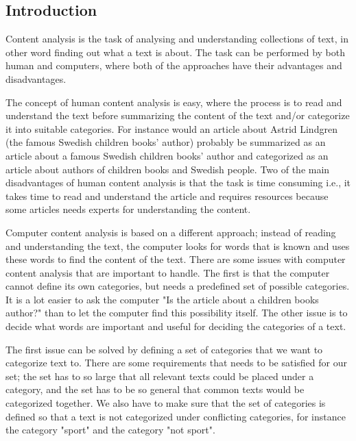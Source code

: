 \documentclass[11pt,english,a4paper]{article}
\begin{document}
\subsection*{Introduction}
Content analysis is the task of analysing and understanding collections of text, in other word finding out what a text is about. The task can be performed by both human and computers, where both of the approaches have their advantages and disadvantages.

The concept of human content analysis is easy, where the process is to read and understand the text before summarizing the content of the text and/or categorize it into suitable categories. For instance would an article about Astrid Lindgren (the famous Swedish children books' author) probably be summarized as an article about a famous Swedish children books' author and categorized as an article about authors of children books and Swedish people. Two of the main disadvantages of human content analysis is that the task is time consuming i.e., it takes time to read and understand the article and requires resources because some articles needs experts for understanding the content. 

Computer content analysis is based on a different approach; instead of reading and understanding the text, the computer looks for words that is known and uses these words to find the content of the text. There are some issues with computer content analysis that are important to handle. The first is that the computer cannot define its own categories, but needs a predefined set of possible categories. It is a lot easier to ask the computer "Is the article about a children books author?" than to let the computer find this possibility itself. The other issue is to decide what words are important and useful for deciding the categories of a text. 

The first issue can be solved by defining a set of categories that we want to categorize text to. There are some requirements that needs to be satisfied for our set; the set has to so large that all relevant texts could be placed under a category, and the set has to be so general that common texts would be categorized together. We also have to make sure that the set of categories is defined so that a text is not categorized under conflicting categories, for instance the category "sport" and the category "not sport". 
\end{document}

